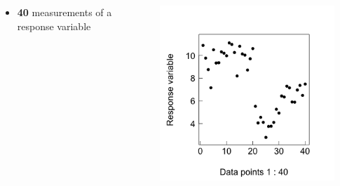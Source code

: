 \documentclass{beamer}
\begin{document}
\begin{frame}{}
  \begin{columns}[onlytextwidth] %
    \begin{column}{0.44\textwidth}
  \begin{itemize}
    \item \textbf{40} measurements of a response variable
  \end{itemize}
    \end{column}
    \hspace{0.02\textwidth} %
    \begin{column}{0.6\textwidth}
      \begin{center}
        \includegraphics[width=0.9\textwidth]{lectures/day_1_intro_to_mems/figures/unnamed-chunk-16-1.png}
      \end{center}
    \end{column}
  \end{columns}
\end{frame}
\end{document}
